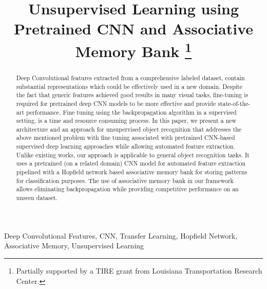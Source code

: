 \documentclass[conference]{IEEEtran}
\begin{document}
\title{Unsupervised Learning using Pretrained CNN and Associative Memory Bank
{\footnotesize \textsuperscript{}}
\thanks{Partially supported by a TIRE grant from Louisiana Transportation Research Center.}
}

\author{
\and
{}
}

\maketitle

\begin{abstract}
Deep Convolutional features extracted from a comprehensive labeled dataset, contain substantial representations which could be effectively used in a new domain. Despite the fact that generic features achieved good results in many visual tasks, fine-tuning is required for pretrained deep CNN models to be more effective and provide state-of-the-art performance. Fine tuning using the backpropagation algorithm in a supervised setting, is a time and resource consuming process. In this paper, we present a new architecture and an approach for unsupervised object recognition that addresses the above mentioned problem with fine tuning associated with pretrained CNN-based supervised deep learning approaches while allowing automated feature extraction. Unlike existing works, our approach is applicable to general object recognition tasks. It uses a pretrained (on a related domain) CNN model for automated feature extraction pipelined with a Hopfield network based associative memory bank for storing patterns for classification purposes. The use of associative memory bank in our framework allows eliminating backpropagation while providing competitive performance on an unseen dataset.

\end{abstract}

\begin{IEEEkeywords}
Deep Convolutional Features, CNN, Transfer Learning, Hopfield Network, Associative Memory, Unsupervised Learning
\end{IEEEkeywords}
\end{document}
